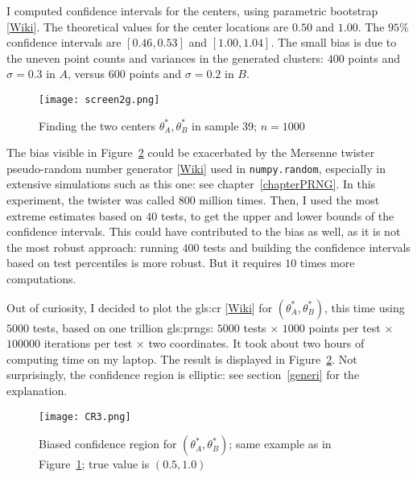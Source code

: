 \documentclass[oneside,10pt]{book}
\begin{document}
I computed confidence intervals for the centers, using \textcolor{index}{parametric bootstrap} [\href{https://en.wikipedia.org/wiki/Bootstrapping_(statistics)#Parametric_bootstrap}{Wiki}]. The theoretical values for the center
 locations are $0.50$ and $1.00$. The $95\%$ confidence intervals are $[0.46,0.53]$ and $[1.00, 1.04]$. The small bias is due to the uneven point counts and variances in the generated clusters: $400$ points and $\sigma=0.3$ in $A$, versus $600$ points and $\sigma=0.2$ in $B$.

\begin{figure}%
\centering
\texttt{[image: screen2g.png]}
\caption{Finding the two centers $\theta_A^*, \theta_B^*$ in sample 39; $n=1000$}
\label{fig:screen2}
\end{figure}

The bias visible in Figure~\ref{fig:cr} could be exacerbated by the
\textcolor{index}{Mersenne twister} pseudo-random number generator [\href{https://en.wikipedia.org/wiki/Mersenne_Twister}{Wiki}] used in \texttt{numpy.random}, especially in extensive simulations such as this one:
 see chapter~\ref{chapterPRNG}. In this experiment, the twister was called $800$ million times.  Then, I used the most extreme estimates based on $40$ tests, to get the upper and lower bounds of the confidence intervals. This could have contributed to the bias as well, as it is not the most robust approach: running $400$ tests and building the confidence intervals based on test percentiles is more robust. But it requires $10$ times more computations.

Out of curiosity, I decided to plot the \gls{gls:cr} [\href{https://en.wikipedia.org/wiki/Confidence_region}{Wiki}] for $(\theta_A^*,\theta_B^*)$, this time using $\num{5000}$ tests,
 based on one trillion \glspl{gls:prng}: $\num{5000}$ tests $\times$ $1000$ points per test $\times$ $\num{100000}$ iterations per test $\times$ two
 coordinates. It took about two hours of computing time on my laptop. The result is displayed in Figure~\ref{fig:cr}. Not surprisingly, the confidence
 region is elliptic: see section~\ref{generi} for the explanation.

\begin{figure}[H]
\centering
\texttt{[image: CR3.png]}
\caption{Biased confidence region for $(\theta_A^*,\theta_B^*)$;  same example as in Figure~\ref{fig:screen2}; true value is $(0.5,1.0)$}
\label{fig:cr}
\end{figure}
\end{document}
